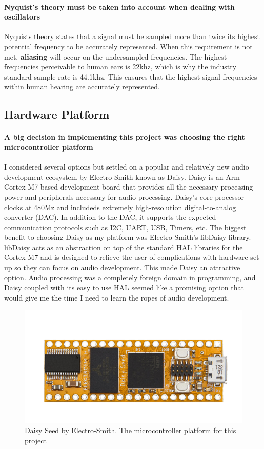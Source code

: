 \documentclass[acmlarge,screen]{acmart}
\begin{document}
	\paragraph{\textbf{Nyquist's theory} must be taken into account when dealing with oscillators} Nyquists theory states that a signal must be sampled more than twice its highest potential frequency to be accurately represented. When this requirement is not met, \textbf{aliasing} will occur on the undersampled frequencies. The highest frequencies perceivable to human ears is 22khz, which is why the industry standard sample rate is 44.1khz. This ensures that the highest signal frequencies within human hearing are accurately represented.

\subsection{Hardware Platform}
	\paragraph{A big decision in implementing this project was choosing the right microcontroller platform} I considered several options but settled on a popular and relatively new audio development ecosystem by Electro-Smith known as Daisy. Daisy is an Arm Cortex-M7 based development board that provides all the necessary processing power and peripherals necessary for audio processing. Daisy's core processor clocks at 480Mz and includeds extremely high-resolution digital-to-analog converter (DAC). In addition to the DAC, it supports the expected communication protocols such as I2C, UART, USB, Timers, etc. The biggest benefit to choosing Daisy as my platform was Electro-Smith's libDaisy library. libDaisy acts as an abstraction on top of the standard HAL libraries for the Cortex M7 and is designed to relieve the user of complications with hardware set up so they can focus on audio development. \cite{electro-smith} This made Daisy an attractive option. Audio processing was a completely foreign domain in programming, and Daisy coupled with its easy to use HAL seemed like a promising option that would give me the time I need to learn the ropes of audio development.
	
	\begin{figure}
		\includegraphics[width=\linewidth]{daisy_promo_pic}
		\caption{Daisy Seed by Electro-Smith. The microcontroller platform for this project}
		\centering
	\end{figure}
\end{document}
